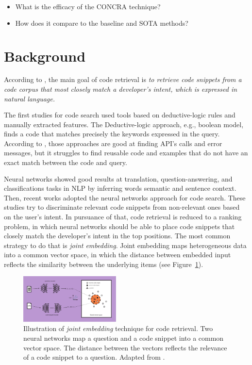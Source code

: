 \documentclass[sigconf]{acmart}
\begin{document}
\begin{itemize}
    \item What is the efficacy of the CONCRA technique? 
    \item How does it compare to the baseline and SOTA methods?
\end{itemize}


\section{Background}

According to \citet{cambronero-deep-code-search-2019}, the main goal of code retrieval is \emph{to retrieve code snippets from a code corpus that most closely match a developer's intent, which is expressed in natural language.}

The first studies for code search used tools based on deductive-logic rules and manually extracted features. The Deductive-logic approach, e.g., boolean model, finds a code that matches precisely the keywords expressed in the query. According to \citet{yan-benchmark-code-search-information-retrieval-deep-learning:2020}, those approaches are good at finding API's calls and error messages, but it struggles to find reusable code and examples that do not have an exact match between the code and query. 

Neural networks showed good results at translation, question-answering, and classifications tasks in NLP by inferring words semantic and sentence context. Then, recent works adopted the neural networks approach for code search. These studies try to discriminate relevant code snippets from non-relevant ones based on the user's intent. In pursuance of that, code retrieval is reduced to a ranking problem, in which neural networks should be able to place code snippets that closely match the developer's intent in the top positions. The most common strategy to do that is \emph{joint embedding}. Joint embedding maps heterogeneous data into a common vector space, in which the distance between embedded input reflects the similarity between the underlying items \cite{li-joint-embedding-images-2015} (see Figure~\ref{fig:joint-embedding}).

\begin{figure}[H]
  \includegraphics[width=0.45\textwidth]{figuras/joint_embedding-article.pdf}
  \caption{Illustration of \emph{joint embedding} technique for code retrieval. Two neural networks map a question and a code snippet into a common vector space. The distance between the vectors reflects the relevance of a code snippet to a question. Adapted from \cite{cambronero-deep-code-search-2019}.}
  \label{fig:joint-embedding}
\end{figure}
\end{document}

